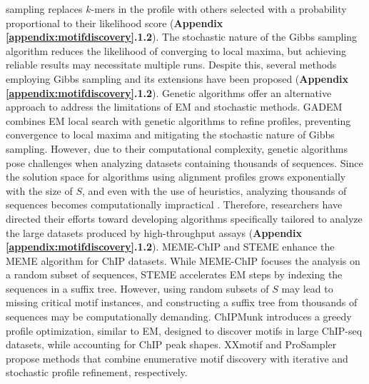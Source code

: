 \documentclass[a4paper, titlepage, openright]{book}
\begin{document}
sampling replaces $k$-mers in the profile with others selected with a probability proportional to their likelihood score (\textbf{Appendix \ref{appendix:motifdiscovery}.1.2}). The stochastic nature of the Gibbs sampling algorithm reduces the likelihood of converging to local maxima, but achieving reliable results may necessitate multiple runs. Despite this, several methods employing Gibbs sampling and its extensions have been proposed \citep{neuwald1995gibbs,hughes2000computational,workman1999ann,liu2000bioprospector,thijs2001higher,frith2004finding,frith2008discovering} (\textbf{Appendix \ref{appendix:motifdiscovery}.1.2}). Genetic algorithms offer an alternative approach to address the limitations of EM and stochastic methods. GADEM \citep{li2009gadem} combines EM local search with genetic algorithms to refine profiles, preventing convergence to local maxima and mitigating the stochastic nature of Gibbs sampling. However, due to their computational complexity, genetic algorithms pose challenges when analyzing datasets containing thousands of sequences. Since the solution space for algorithms using alignment profiles grows exponentially with the size of $S$, and even with the use of heuristics, analyzing thousands of sequences becomes computationally impractical \citep{zambelli2013motif}. Therefore, researchers have directed their efforts toward developing algorithms specifically tailored to analyze the large datasets produced by high-throughput assays (\textbf{Appendix \ref{appendix:motifdiscovery}.1.2}). MEME-ChIP \citep{machanick2011meme} and STEME \citep{reid2011steme} enhance the MEME algorithm for ChIP datasets. While MEME-ChIP focuses the analysis on a random subset of sequences, STEME accelerates EM steps by indexing the sequences in a suffix tree. However, using random subsets of $S$ may lead to missing critical motif instances, and constructing a suffix tree from thousands of sequences may be computationally demanding. ChIPMunk \citep{kulakovskiy2010deep} introduces a greedy profile optimization, similar to EM, designed to discover motifs in large ChIP-seq datasets, while accounting for ChIP peak shapes. XXmotif \citep{hartmann2013p} and ProSampler \citep{li2019prosampler} propose methods that combine enumerative motif discovery with iterative and stochastic profile refinement, respectively.

\end{document}
